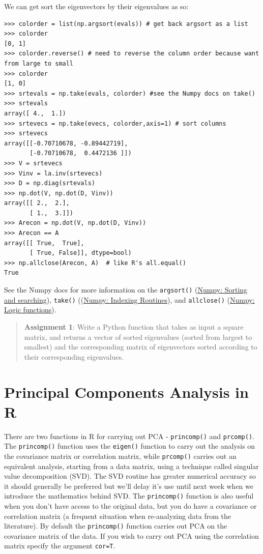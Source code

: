 We can get sort the eigenvectors by their eigenvalues as so:

\begin{lstlisting}
>>> colorder = list(np.argsort(evals)) # get back argsort as a list
>>> colorder
[0, 1]
>>> colorder.reverse() # need to reverse the column order because want from large to small
>>> colorder
[1, 0]
>>> srtevals = np.take(evals, colorder) #see the Numpy docs on take()
>>> srtevals
array([ 4.,  1.])
>>> srtevecs = np.take(evecs, colorder,axis=1) # sort columns
>>> srtevecs
array([[-0.70710678, -0.89442719],
       [-0.70710678,  0.4472136 ]])
>>> V = srtevecs
>>> Vinv = la.inv(srtevecs)
>>> D = np.diag(srtevals)
>>> np.dot(V, np.dot(D, Vinv))
array([[ 2.,  2.],
       [ 1.,  3.]])
>>> Arecon = np.dot(V, np.dot(D, Vinv))
>>> Arecon == A
array([[ True,  True],
       [ True, False]], dtype=bool)
>>> np.allclose(Arecon, A)  # like R's all.equal()
True     
\end{lstlisting}
See the Numpy docs for more information on the \lstinline!argsort()!
(\href{http://docs.scipy.org/doc/numpy/reference/routines.sort.html}{Numpy:
Sorting and searching}), \lstinline!take()!
((\href{http://docs.scipy.org/doc/numpy/reference/routines.indexing.html}{Numpy:
Indexing Routines}), and \lstinline!allclose()!
(\href{http://docs.scipy.org/doc/numpy/reference/routines.logic.html}{Numpy:
Logic functions}).

\begin{quote}
\textbf{Assignment 1}: Write a Python function that takes as input a
square matrix, and returns a vector of sorted eigenvalues (sorted from
largest to smallest) and the corresponding matrix of eigenvectors sorted
according to their corresponding eigenvalues.

\end{quote}
\section{Principal Components Analysis in R}

There are two functions in R for carrying out PCA -
\lstinline!princomp()! and \lstinline!prcomp()!. The
\lstinline!princomp()! function uses the \lstinline!eigen()! function to
carry out the analysis on the covariance matrix or correlation matrix,
while \lstinline!prcomp()! carries out an equivalent analysis, starting
from a data matrix, using a technique called singular value
decomposition (SVD). The SVD routine has greater numerical accuracy so
it should generally be preferred but we'll delay it's use until next
week when we introduce the mathematics behind SVD. The
\lstinline!princomp()! function is also useful when you don't have
access to the original data, but you do have a covariance or correlation
matrix (a frequent situation when re-analyzing data from the
literature). By default the \lstinline!princomp()! function carries out
PCA on the covariance matrix of the data. If you wish to carry out PCA
using the correlation matrix specify the argument \lstinline!cor=T!.

